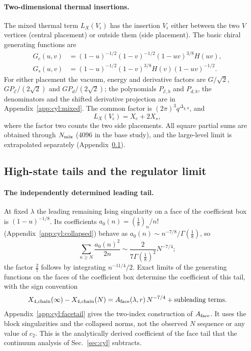 \documentclass[11pt,a4paper]{article}
\numberwithin{equation}{section}
\begin{document}
\paragraph{Two-dimensional thermal insertions.} The mixed thermal term $L_X(V_\epsilon)$ has the insertion $V_\epsilon$
either between the two $V$ vertices (central placement) or outside them (side placement). The basic chiral generating
functions are
\begin{equation}
\begin{aligned}
 G_c(u,v)&=(1-u)^{-1/2}(1-v)^{-1/2}(1-uv)^{3/8}H(uv),\\
 G_s(u,v)&=(1-u)^{-1/2}(1-v)^{3/8}H(v)(1-uv)^{-1/2}.
\end{aligned}
\end{equation}
For either placement the vacuum, energy and derivative factors are $G/\sqrt2$, $GP_{\mathcal E}/(2\sqrt2)$ and
$GP_d/(2\sqrt2)$; the polynomials $P_{\mathcal E,b}$ and $P_{d,b}$, the denominators and the shifted derivative projection are in
Appendix~\ref{app:cyl:mixed}. The common factor is $(2\pi)^3q^{\Delta_{\chi,0}}$, and
\begin{equation}
 L_X(V_\epsilon)=X_c+2X_s,
\end{equation}
where the factor two counts the two side placements. All square partial sums are obtained through $N_{\rm mix}$ (4096
in the base study), and the large-level limit is extrapolated separately (Appendix~\ref{app:cyl:tails}).

\subsection{High-state tails and the regulator limit}\label{app:cyl:tails}
\paragraph{The independently determined leading tail.} At fixed $\lambda$ the leading remaining Ising singularity on a
face of the coefficient box is $(1-u)^{-1/8}$. Its coefficients $a_0(n)=(\frac18)_n/n!$ (Appendix~\ref{app:cyl:collapsed})
behave as $a_0(n)\sim n^{-7/8}/\Gamma(\frac18)$, so
\begin{equation}
 \sum_{n\ge N}\frac{a_0(n)^2}{2n}\sim\frac{2}{7\Gamma(\frac18)^2}N^{-7/4};
 \label{eq:cyl:tailpower}
\end{equation}
the factor $\frac27$ follows by integrating $n^{-11/4}/2$. Exact limits of the generating functions on the faces of the
coefficient box determine the coefficient of this tail, with the sign convention
\begin{equation}
 X_{4,\rm chain}(\infty)-X_{4,\rm chain}(N)=A_{\rm face}(\lambda,r)\,N^{-7/4}+\text{subleading terms}.
\end{equation}
Appendix~\ref{app:cyl:facetail} gives the two-index construction of $A_{\rm face}$. It uses the block singularities and the
collapsed norms, not the observed $N$ sequence or any value of $c_2$. This is the analytically derived coefficient of
the face tail that the continuum analysis of Sec.~\ref{sec:cyl} subtracts.
\end{document}
